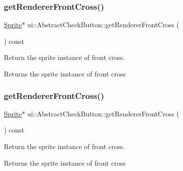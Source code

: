 \subsubsection{\texorpdfstring{get\+Renderer\+Front\+Cross()}{getRendererFrontCross()}\hspace{0.1cm}{\footnotesize\ttfamily [1/2]}}
{\footnotesize\ttfamily \hyperlink{classSprite}{Sprite}$\ast$ ui\+::\+Abstract\+Check\+Button\+::get\+Renderer\+Front\+Cross (\begin{DoxyParamCaption}{ }\end{DoxyParamCaption}) const\hspace{0.3cm}{\ttfamily [inline]}}



Return the sprite instance of front cross. 

\begin{DoxyReturn}{Returns}
the sprite instance of front cross 
\end{DoxyReturn}
\mbox{\label{classui_1_1AbstractCheckButton_a6527e80f91a37299249d5b95e6d32a17}} 
\subsubsection{\texorpdfstring{get\+Renderer\+Front\+Cross()}{getRendererFrontCross()}\hspace{0.1cm}{\footnotesize\ttfamily [2/2]}}
{\footnotesize\ttfamily \hyperlink{classSprite}{Sprite}$\ast$ ui\+::\+Abstract\+Check\+Button\+::get\+Renderer\+Front\+Cross (\begin{DoxyParamCaption}{ }\end{DoxyParamCaption}) const\hspace{0.3cm}{\ttfamily [inline]}}



Return the sprite instance of front cross. 

\begin{DoxyReturn}{Returns}
the sprite instance of front cross 
\end{DoxyReturn}
\mbox{\label{classui_1_1AbstractCheckButton_a6b8e3b669fd52665e7ec93157dd1de06}} 
